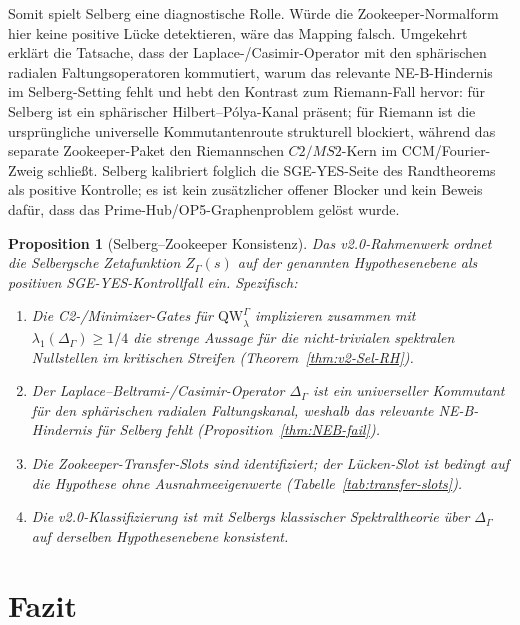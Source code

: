 \documentclass[12pt,a4paper]{article}
\newtheorem{proposition}[theorem]{Proposition}
\theoremstyle{definition}
\theoremstyle{remark}
\newcommand{\QW}{\mathrm{QW}}
\newcommand{\Sel}{Z_{\Gamma}}
\newcommand{\Delop}{\Delta_{\Gamma}}
\begin{document}
Somit spielt Selberg eine diagnostische Rolle.  Würde die Zookeeper-Normalform hier keine
positive Lücke detektieren, wäre das Mapping falsch.  Umgekehrt
erklärt die Tatsache, dass der Laplace-/Casimir-Operator mit den
sphärischen radialen Faltungsoperatoren kommutiert, warum das relevante
NE-B-Hindernis im Selberg-Setting fehlt und hebt den Kontrast zum Riemann-Fall
hervor: für Selberg ist ein sphärischer Hilbert--Pólya-Kanal präsent; für
Riemann ist die ursprüngliche universelle Kommutantenroute strukturell
blockiert, während das separate Zookeeper-Paket den Riemannschen $C2/MS2$-Kern
im CCM/Fourier-Zweig schließt.  Selberg kalibriert folglich die
SGE-YES-Seite des Randtheorems als positive Kontrolle; es ist kein
zusätzlicher offener Blocker und kein Beweis dafür, dass das
Prime-Hub/OP5-Graphenproblem gelöst wurde.

\begin{proposition}[Selberg--Zookeeper Konsistenz]
\label{prop:selberg-zookeeper}
Das v2.0-Rahmenwerk ordnet die Selbergsche Zetafunktion
$\Sel(s)$ auf der genannten Hypothesenebene als positiven
SGE-YES-Kontrollfall ein.  Spezifisch:
\begin{enumerate}[label=(\roman*)]
  \item Die C2-/Minimizer-Gates für $\QW^\Gamma_\lambda$ implizieren zusammen
    mit $\lambda_1(\Delop)\ge 1/4$ die strenge Aussage für die nicht-trivialen
    spektralen Nullstellen im kritischen Streifen (Theorem~\ref{thm:v2-Sel-RH}).
  \item Der Laplace--Beltrami-/Casimir-Operator $\Delop$ ist ein universeller
    Kommutant für den sphärischen radialen Faltungskanal, weshalb das
    relevante NE-B-Hindernis für Selberg fehlt
    (Proposition~\ref{thm:NEB-fail}).
  \item Die Zookeeper-Transfer-Slots sind identifiziert; der Lücken-Slot ist
    bedingt auf die Hypothese ohne Ausnahmeeigenwerte
    (Tabelle~\ref{tab:transfer-slots}).
  \item Die v2.0-Klassifizierung ist mit Selbergs klassischer Spektraltheorie
    über $\Delop$ auf derselben Hypothesenebene konsistent.
\end{enumerate}
\end{proposition}

\section{Fazit}
\label{sec:conclusion}
\end{document}
